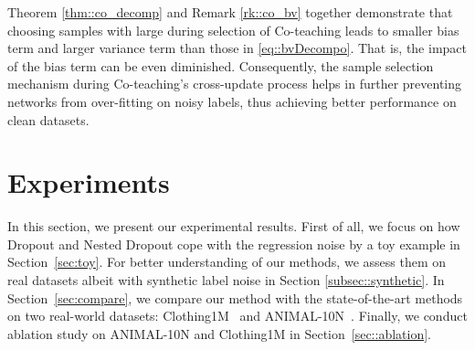 \documentclass[journal]{IEEEtran}
\begin{document}
Theorem \ref{thm::co_decomp} and Remark \ref{rk::co_bv} together demonstrate that choosing samples with large  during selection of Co-teaching leads to smaller bias term and larger variance term than those in \eqref{eq::bvDecompo}.
That is, the impact of the bias term can be even diminished.
Consequently, the sample selection mechanism during Co-teaching's cross-update process helps in further preventing networks from over-fitting on noisy labels, thus achieving better performance on clean datasets.

\section{Experiments} \label{sec::experiments}
In this section, we present our experimental results. 
First of all, we focus on how Dropout and Nested Dropout cope with the regression noise by a toy example in Section~\ref{sec:toy}. 
For better understanding of our methods, we assess them on real datasets albeit with synthetic label noise in Section \ref{subsec::synthetic}.
In Section~\ref{sec:compare}, we compare our method with the state-of-the-art methods on two real-world datasets: Clothing1M~\cite{xiao2015learning} and ANIMAL-10N~\cite{song2019selfie}. 
Finally, we conduct ablation study on ANIMAL-10N and Clothing1M in Section~\ref{sec::ablation}. 
\end{document}
